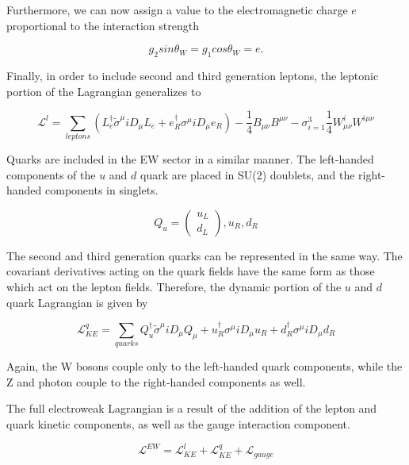 Furthermore, we can now assign a value to the electromagnetic charge $e$ proportional to the interaction strength

\begin{equation}
g_{2}sin\theta_{W}=g_{1}cos\theta_{W}=e.
\end{equation}

Finally, in order to include second and third generation leptons, the leptonic portion of the Lagrangian generalizes to 

\begin{equation}
\mathcal{L}^{l} = \sum_{leptons}(L_{e}^{\dagger}\tilde{\sigma}^{\mu}iD_{\mu}L_{e}+e_{R}^{\dagger}\sigma^{\mu}iD_{\mu}e_{R}) - \frac{1}{4}B_{\mu\nu}B^{\mu\nu}- \sigma_{i=1}^{3}\frac{1}{4}W_{\mu\nu}^{i}W^{i\mu\nu}
\end{equation}

Quarks are included in the EW sector in a similar manner. The left-handed components of the $u$ and $d$ quark are placed in SU(2) doublets, and the right-handed components in singlets.

\begin{equation}
Q_{u} = \begin{pmatrix}
	u_{L} \\
	d_{L}
\end{pmatrix}, u_{R}, d_{R}
\end{equation}

The second and third generation quarks can be represented in the same way. The covariant derivatives acting on the quark fields have the same form as those which act on the lepton fields. Therefore, the dynamic portion of the $u$ and $d$ quark Lagrangian is given by

\begin{equation}
\label{Lquark}
\mathcal{L}^{q}_{KE} = \sum_{quarks}Q_{u}^{\dagger}\tilde{\sigma}^{\mu}iD_{\mu}Q_{\mu}+u_{R}^{\dagger}\sigma^{\mu}iD_{\mu}u_{R}+d^{\dagger}_{R}\sigma^{\mu}iD_{\mu}d_{R}
\end{equation}

Again, the W bosons couple only to the left-handed quark components, while the Z and photon couple to the right-handed components as well.

The full electroweak Lagrangian is a result of the addition of the lepton and quark kinetic components, as well as the gauge interaction component.

\begin{equation}
\mathcal{L}^{EW} = \mathcal{L}^{l}_{KE} + \mathcal{L}_{KE}^{q} + \mathcal{L}_{gauge}
\end{equation}

